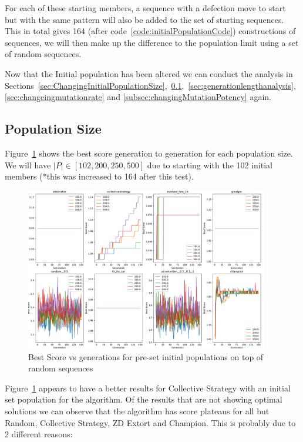 For each of these starting members, a sequence with a defection move to start but with the same pattern will also be added to the set of starting sequences.
This in total gives 164 (after code~\ref{code:initialPopulationCode}) constructions of sequences, we will then make up the difference to the population limit using a set of random sequences.

Now that the Initial population has been altered we can conduct the analysis in Sections~\ref{sec:ChangingInitialPopulationSize},~\ref{subsec:populationSize},~\ref{sec:generationlengthanalysis},~\ref{sec:changeingmutationrate} and \ref{subsec:changingMutationPotency} again.

\subsection{Population Size}\label{subsec:populationSize}
Figure~\ref{fig:NEW-INIT-POP-bs-v-gen-all} shows the best score generation to generation for each population size.
We will have \(|P| \in [102,200,250,500]\) due to starting with the 102 initial members (*this was increased to 164 after this test).

\begin{figure}[ht]
    \includegraphics[width=0.95\textwidth, keepaspectratio, center]{./img/plots/NEW_INIT_POP_bs_v_gen_all_old.pdf}
    \caption{Best Score vs generations for pre-set initial populations on top of random sequences}\label{fig:NEW-INIT-POP-bs-v-gen-all}
\end{figure}

Figure~\ref{fig:NEW-INIT-POP-bs-v-gen-all} appears to have a better results for Collective Strategy with an initial set population for the algorithm.
Of the results that are not showing optimal solutions we can observe that the algorithm has score plateaus for all but Random, Collective Strategy, ZD Extort and Champion.
This is probably due to 2 different reasons:

